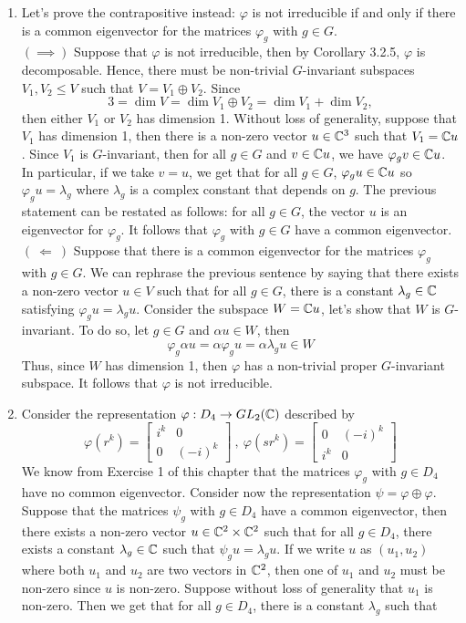 \begin{solution}
    \begin{enumerate}
        \item Let's prove the contrapositive instead: $\varphi$ is not irreducible if and only if there is a common eigenvector for the matrices $\varphi_g$ with $g \in G$. \\
        $(\implies)$ Suppose that $\varphi$ is not irreducible, then by Corollary 3.2.5, $\varphi$ is decomposable. Hence, there must be non-trivial $G$-invariant subspaces $V_1, V_2 \leq V$ such that $V = V_1 \oplus V_2$. Since
        $$3 = \dim V = \dim V_1 \oplus V_2 = \dim V_1 + \dim V_2,$$
        then either $V_1$ or $V_2$ has dimension 1. Without loss of generality, suppose that $V_1$ has dimension 1, then there is a non-zero vector $u \in \mathbb{C}^3$ such that $V_1 = \mathbb{C} u$. Since $V_1$ is $G$-invariant, then for all $g \in G$ and $v \in \mathbb{C} u$, we have $\varphi_g v \in \mathbb{C} u$. In particular, if we take $v = u$, we get that for all $g \in G$, $\varphi_g u \in \mathbb{C} u$ so $\varphi_g u = \lambda_g$ where $\lambda_g$ is a complex constant that depends on $g$. The previous statement can be restated as follows: for all $g \in G$, the vector $u$ is an eigenvector for $\varphi_g$. It follows that $\varphi_g$ with $g \in G$ have a common eigenvector. \\
        $( \ \Longleftarrow \ )$ Suppose that there is a common eigenvector for the matrices $\varphi_g$ with $g \in G$. We can rephrase the previous sentence by saying that there exists a non-zero vector $u \in V$ such that for all $g \in G$, there is a constant $\lambda_g \in \mathbb{C}$ satisfying $\varphi_g u = \lambda_g u$. Consider the subspace $W = \mathbb{C} u$, let's show that $W$ is $G$-invariant. To do so, let $g \in G$ and $\alpha u \in W$, then
        $$\varphi_g \alpha u = \alpha \varphi_g u = \alpha \lambda_g u \in W $$
        Thus, since $W$ has dimension 1, then $\varphi$ has a non-trivial proper $G$-invariant subspace. It follows that $\varphi$ is not irreducible.
        \item Consider the representation $\varphi : D_4 \to GL_2(\mathbb{C})$ described by
        $$\varphi(r^k) = \begin{bmatrix}i^k & 0 \\ 0 & (-i)^k\end{bmatrix} \ , \ \varphi(sr^k) = \begin{bmatrix}0 & (-i)^k \\ i^k & 0 \end{bmatrix}$$
        We know from Exercise 1 of this chapter that the matrices $\varphi_g$ with $g \in D_4$ have no common eigenvector. Consider now the representation $\psi = \varphi \oplus \varphi$. Suppose that the matrices $\psi_g$ with $g \in D_4$ have a common eigenvector, then there exists a non-zero vector $u \in \mathbb{C}^2 \times \mathbb{C}^2$ such that for all $g \in D_4$, there exists a constant $\lambda_g \in \mathbb{C}$ such that $\psi_g u = \lambda_g u$. If we write $u$ as $(u_1, u_2)$ where both $u_1$ and $u_2$ are two vectors in $\mathbb{C}^2$, then one of $u_1$ and $u_2$ must be non-zero since $u$ is non-zero. Suppose without loss of generality that $u_1$ is non-zero. Then we get that for all $g \in D_4$, there is a constant $\lambda_g$ such that 

\end{enumerate}
\end{solution}
